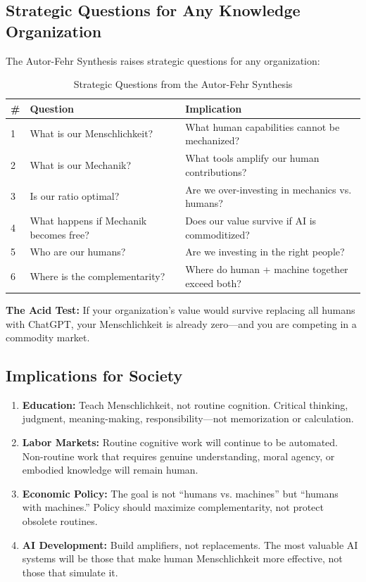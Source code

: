 \subsection{Strategic Questions for Any Knowledge Organization}

The Autor-Fehr Synthesis raises strategic questions for any organization:

\begin{table}[htbp]
\centering
\caption{Strategic Questions from the Autor-Fehr Synthesis}
\renewcommand{\arraystretch}{1.4}
\begin{tabular}{@{}p{0.5cm}p{5.5cm}p{6cm}@{}}
\toprule
\textbf{\#} & \textbf{Question} & \textbf{Implication} \\
\midrule
1 & What is our Menschlichkeit? & What human capabilities cannot be mechanized? \\
2 & What is our Mechanik? & What tools amplify our human contributions? \\
3 & Is our ratio optimal? & Are we over-investing in mechanics vs. humans? \\
4 & What happens if Mechanik becomes free? & Does our value survive if AI is commoditized? \\
5 & Who are our humans? & Are we investing in the right people? \\
6 & Where is the complementarity? & Where do human + machine together exceed both? \\
\bottomrule
\end{tabular}
\end{table}

\textbf{The Acid Test:} If your organization's value would survive replacing all humans with ChatGPT, your Menschlichkeit is already zero---and you are competing in a commodity market.

\subsection{Implications for Society}

\begin{enumerate}
    \item \textbf{Education:} Teach Menschlichkeit, not routine cognition. Critical thinking, judgment, meaning-making, responsibility---not memorization or calculation.

    \item \textbf{Labor Markets:} Routine cognitive work will continue to be automated. Non-routine work that requires genuine understanding, moral agency, or embodied knowledge will remain human.

    \item \textbf{Economic Policy:} The goal is not ``humans vs. machines'' but ``humans with machines.'' Policy should maximize complementarity, not protect obsolete routines.

    \item \textbf{AI Development:} Build amplifiers, not replacements. The most valuable AI systems will be those that make human Menschlichkeit more effective, not those that simulate it.
\end{enumerate}

